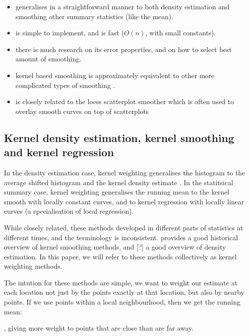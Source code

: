 \documentclass[journal]{vgtc}                %
\begin{document}
\begin{itemize}
  \item generalises in a straightforward manner to both density estimation and smoothing other summary statistics (like the mean).

  \item is simple to implement, and is fast ($O(n)$, with small constants).
  
  \item there is much research on its error properties, and on how to select best amount of smoothing.
  
  \item kernel based smoothing is approximately equivalent to other more complicated types of smoothing \citep{silverman:1984}.
  
  \item is closely related to the {\sc loess} scatterplot smoother \citep{cleveland:1979} which is often used to overlay smooth curves on top of scatterplots

\end{itemize}

\subsection{Kernel density estimation, kernel smoothing and kernel regression}

In the density estimation case, kernel weighting generalises the histogram to the average shifted histogram \citep{scott:1985} and the kernel density estimate \citep{scott:1992}. In the statitsical summary case, kernel weighting generalises the running mean to the kernel smooth with locally constant curves, and to kernel regression with locally linear curves (a specialisation of local regression).

While closely related, these methods developed in different parts of statistics at different times, and the terminology is inconsistent. \citep{cleveland:1996} provides a good historical overview of kernel smoothing methods, and [?] a good overview of density estimation. In this paper, we will refer to these methods collectively as kernel weighting methods.

The intution for these methods are simple, we want to weight our estimate at each location not just by the points exactly at that location, but also by nearby points. If we use points within a local neighbourhood, then we get the running mean:


, giving more weight to points that are close than are far away.  
\end{document}
